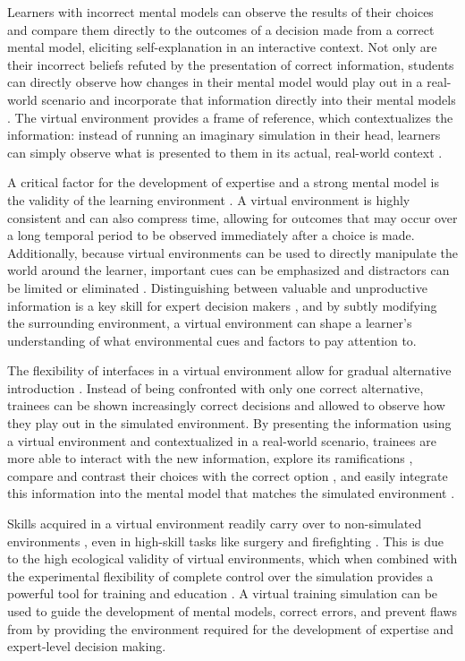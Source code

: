 Learners with incorrect mental models can observe the results of their choices and compare them directly to the outcomes of a decision made from a correct mental model, eliciting self-explanation in an interactive context. Not only are their incorrect beliefs refuted by the presentation of correct information, students can directly observe how changes in their mental model would play out in a real-world scenario and incorporate that information directly into their mental models \citep{Salzman1999}. The virtual environment provides a frame of reference, which contextualizes the information: instead of running an imaginary simulation in their head, learners can simply observe what is presented to them in its actual, real-world context \citep{Erickson1993}.

A critical factor for the development of expertise and a strong mental model is the validity of the learning environment \citep{Klein2006, Kahneman2009}. A virtual environment is highly consistent and can also compress time, allowing for outcomes that may occur over a long temporal period to be observed immediately after a choice is made. Additionally, because virtual environments can be used to directly manipulate the world around the learner, important cues can be emphasized and distractors can be limited or eliminated \citep{Salzman1999}. Distinguishing between valuable and unproductive information is a key skill for expert decision makers \citep{Klein1992}, and by subtly modifying the surrounding environment, a virtual environment can shape a learner's understanding of what environmental cues and factors to pay attention to.

The flexibility of interfaces in a virtual environment allow for gradual alternative introduction \citep{Erickson1993}. Instead of being confronted with only one correct alternative, trainees can be shown increasingly correct decisions and allowed to observe how they play out in the simulated environment. By presenting the information using a virtual environment and contextualized in a real-world scenario, trainees are more able to interact with the new information, explore its ramifications \citep{Erickson1993, Patterson2010}, compare and contrast their choices with the correct option \citep{Fowlkes2009}, and easily integrate this information into the mental model that matches the simulated environment \citep{Salzman1999}.

Skills acquired in a virtual environment readily carry over to non-simulated environments \citep{Cromby1996, Watanuki2007}, even in high-skill tasks like surgery \citep{Seymour2002} and firefighting \citep{Bliss1997}. This is due to the high ecological validity of virtual environments, which when combined with the experimental flexibility of complete control over the simulation provides a powerful tool for training and education \citep{Loomis1999}. A virtual training simulation can be used to guide the development of mental models, correct errors, and prevent flaws from by providing the environment required for the development of expertise and expert-level decision making.
